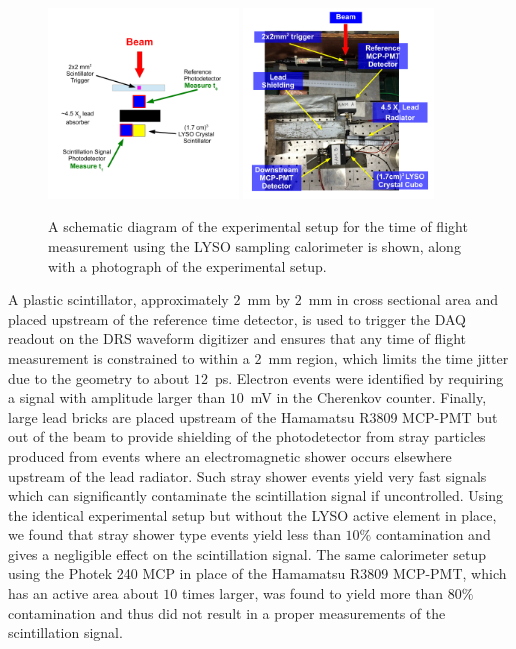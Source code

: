 \documentclass[11pt]{article}
\begin{document}
\begin{figure}[h] \centering
\includegraphics[width=0.45\textwidth]{figs/LYSOSamplingCaloSetupSchematic} 
\includegraphics[width=0.45\textwidth]{figs/LYSOSamplingCaloSetupPhoto} 
\caption{ A schematic diagram of the experimental setup for the
time of flight measurement using the LYSO sampling calorimeter
is shown, along with a photograph of the experimental setup. } 
\label{fig:LYSOSamplingCaloSetup}
\end{figure}

A plastic scintillator, approximately $2$~mm by $2$~mm in cross sectional area
and placed upstream of the reference time detector, is used to trigger
the DAQ readout on the DRS waveform digitizer and ensures that any
time of flight measurement is constrained to within a $2$~mm region,
which limits the time jitter due to the geometry to about $12$~ps. 
Electron events were identified by requiring a signal with amplitude
larger than $10$~mV in the Cherenkov counter.
Finally, large lead bricks are placed upstream of the Hamamatsu
R3809 MCP-PMT but out of the beam to provide shielding of the photodetector
from stray particles produced from events where an electromagnetic shower
occurs elsewhere upstream of the lead radiator. Such stray shower
events yield very fast signals which can significantly contaminate the
scintillation signal if uncontrolled. Using the identical
experimental setup but without the LYSO active element in place,
we found that stray shower type events yield less than $10\%$ contamination
and gives a negligible effect on the scintillation signal. The same calorimeter
setup using the Photek 240 MCP in place of the Hamamatsu R3809 MCP-PMT,
which has an active area about $10$ times larger, was found to yield 
more than $80\%$ contamination and thus did not result in a proper
measurements of the scintillation signal.
\end{document}
